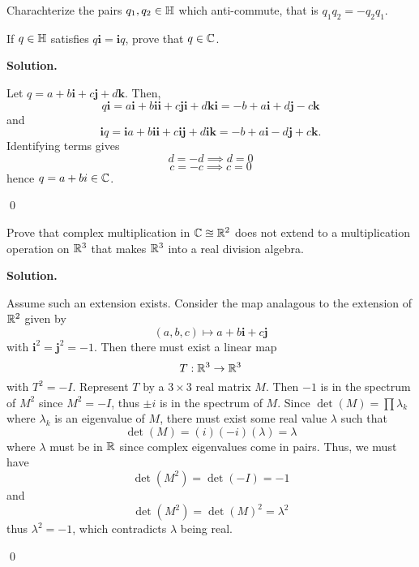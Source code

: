 \documentclass[12pt]{book}
\theoremstyle{definition}
\newenvironment{solution}
{%
  \par\noindent\textbf{Solution.}\quad
}
{%
  \qed\par
}
\begin{document}
\begin{taggedexercise}[TODO]
  Charachterize the pairs $q_1, q_2 \in \mathbb{H}$ which anti-commute, that is $q_1q_2 = -q_2q_1$.
\end{taggedexercise}

\begin{taggedexercise}[Complete]
  If $q \in \mathbb{H}$ satisfies $q\mathbf{i} = \mathbf{i}q$, prove that $q \in \mathbb{C}$.
\end{taggedexercise}
\begin{solution}
  Let $q = a + b\mathbf{i} + c\mathbf{j} + d\mathbf{k}$. Then,
  \[
    q\mathbf{i} = a\mathbf{i} + b\mathbf{i}\mathbf{i} + c\mathbf{j}\mathbf{i} + d\mathbf{k}\mathbf{i} = -b + a\mathbf{i} + d\mathbf{j} - c\mathbf{k}
  \]
  and
  \[
    \mathbf{i}q = \mathbf{i}a + b\mathbf{i}\mathbf{i} + c\mathbf{i}\mathbf{j} + d\mathbf{i}\mathbf{k} = -b + a\mathbf{i} - d\mathbf{j} + c\mathbf{k}.
  \]
  Identifying terms gives
  \[
  d = -d \implies d = 0 
  \]
  \[
  c = -c \implies c = 0
  \]
  hence $q = a+bi \in \mathbb{C}$.

\end{solution}

\begin{taggedexercise}[Complete]
  Prove that complex multiplication in $\mathbb{C} \approxeq \mathbb{R}^2$ does not extend to a multiplication operation on $\mathbb{R}^3$ that makes $\mathbb{R}^3$ into a real division algebra.
\end{taggedexercise}

\begin{solution}
  Assume such an extension exists. 
  Consider the map analagous to the extension of $\mathbb{R}^2$ given by
  \[
  (a,b,c) \mapsto a + b\mathbf{i} + c \mathbf{j}
  \]
  with $\mathbf{i}^2 = \mathbf{j}^2 = -1$. 
  Then there must exist a linear map 
  \[
  T: \mathbb{R}^3 \to \mathbb{R}^3
  \]
  with $T^2 = -I$. 
  Represent $T$ by a $3 \times 3$ real matrix $M$. 
  Then $-1$ is in the spectrum of $M^2$ since $M^2 = -I$, thus $\pm i$ is in the spectrum of $M$.
  Since $\det(M) = \prod \lambda_k$ where $\lambda_k$ is an eigenvalue of $M$, there must exist some real value $\lambda$ such that
  \[
  \det(M) = (i)(-i)(\lambda) = \lambda
  \]
  where $\lambda$ must be in $\mathbb{R}$ since complex eigenvalues come in pairs.
  Thus, we must have
  \[
  \det(M^2) = \det(-I) = -1
  \]
  and
  \[
  \det(M^2) = \det(M)^2 = \lambda^2
  \]
  thus $\lambda^2 = -1$, which contradicts $\lambda$ being real.
  
\end{solution}
\end{document}
